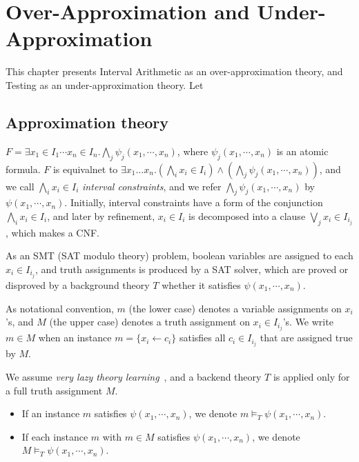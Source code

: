 \chapter{Over-Approximation and Under-Approximation}
This chapter presents Interval Arithmetic as an over-approximation theory, and Testing as an under-approximation theory.
Let 
\section{Approximation theory}
$F = \exists x_1 \in I_1 \cdots x_n \in I_n. \bigwedge \limits_j \psi_j(x_1,\cdots,x_n)$, 
where $\psi_j(x_1,\cdots,x_n)$ is an atomic formula. 
%
$F$ is equivalnet to 
$\exists x_1 \ldots x_n. (\bigwedge \limits_i x_i \in I_i) \wedge (\bigwedge \limits_j \psi_j(x_1,\cdots,x_n))$, 
and we call $\bigwedge \limits_i x_i \in I_i$ {\em interval constraints}, and 
we refer $\bigwedge \limits_j \psi_j(x_1,\cdots,x_n)$ by $\psi(x_1,\cdots,x_n)$. 
Initially, interval constraints have a form of the conjunction $\bigwedge \limits_i x_i \in I_i$, 
and later by refinement, $x_i \in I_i$ is decomposed into a clause $\bigvee_j x_i \in I_{i_j}$, 
which makes a CNF. 

As an SMT (SAT modulo theory) problem, 
boolean variables are assigned to each $x_i \in I_{i_j}$, 
and truth assignments is produced by a SAT solver, 
which are proved or disproved by a background theory $T$ whether it satisfies $\psi(x_1,\cdots,x_n)$. 

As notational convention, $m$ (the lower case) denotes 
a variable assignments on $x_i$'s, and 
$M$ (the upper case) denotes a truth assignment on $x_i \in I_{i_j}$'s. 
We write $m \in M$ when an instance $m = \{ x_i \leftarrow c_i \}$ satisfies 
all $c_i \in I_{i_j}$ that are assigned true by $M$. 

We assume {\em very lazy theory learning}~\cite{dpll}, and 
a backend theory $T$ is applied only for a full truth assignment $M$. 
\begin{itemize}
\item If an instance $m$ satisfies $\psi(x_1,\cdots,x_n)$, we denote $m \models_T \psi(x_1,\cdots,x_n)$. 
\item If each instance $m$ with $m \in M$ satisfies $\psi(x_1,\cdots,x_n)$, 
we denote $M \models_T \psi(x_1,\cdots,x_n)$. 
\end{itemize}

